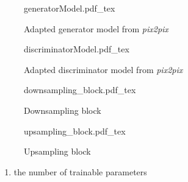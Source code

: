 \begin{figure}[p]
    \tiny
    {generatorModel.pdf_tex}
    \caption{Adapted generator model from \emph{pix2pix}} \label{fig:methods:GAN_arch:generator}
\end{figure}
\begin{figure}[p]
    \scriptsize
    \centering
    {discriminatorModel.pdf_tex}
    \caption{Adapted discriminator model from \emph{pix2pix}} \label{fig:methods:GAN_arch:discriminator}
\end{figure}
\begin{figure}[p]
    \scriptsize
    \centering
    {downsampling_block.pdf_tex}
    \caption{Downsampling block} \label{fig:methods:GAN_arch:downsampling}
\end{figure}
\begin{figure}[p]
    \scriptsize
    \centering
    {upsampling_block.pdf_tex}
    \caption{Upsampling block} \label{fig:methods:GAN_arch:upsampling}
\end{figure}


\begin{enumerate}
 \item the number of trainable parameters \xxx
\end{enumerate}

